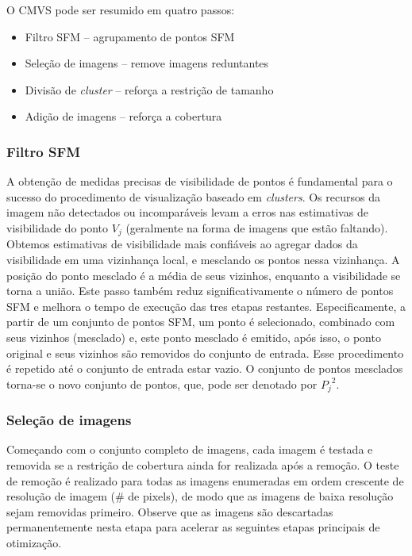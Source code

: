 \begin{itemize}
O CMVS pode ser resumido em quatro passos:

\begin{itemize}
\item Filtro SFM -- agrupamento de pontos SFM
\item Seleção de imagens -- remove imagens reduntantes
\item Divisão de \emph{cluster} -- reforça a restrição de tamanho
\item Adição de imagens -- reforça a cobertura
\end{itemize}

\subsubsection*{Filtro SFM}
A obtenção de medidas precisas de visibilidade de pontos é fundamental para o sucesso do procedimento de visualização baseado em \emph{clusters}. Os recursos da imagem não detectados ou incomparáveis levam a erros nas estimativas de visibilidade do ponto $V_j$ (geralmente na forma de imagens que estão faltando). Obtemos estimativas de visibilidade mais confiáveis ao agregar dados da visibilidade em uma vizinhança local, e mesclando os pontos nessa vizinhança. A posição do ponto mesclado é a média de seus vizinhos, enquanto a visibilidade se torna a união. Este passo também reduz significativamente o número de pontos SFM e melhora o tempo de execução das tres etapas restantes. Especificamente, a partir de um conjunto de pontos SFM, um ponto é selecionado, combinado com seus vizinhos (mesclado) e, este ponto mesclado é emitido, após isso, o ponto original e seus vizinhos são removidos do conjunto de entrada. Esse procedimento é repetido até o conjunto de entrada estar vazio. O conjunto de pontos mesclados torna-se o novo conjunto de pontos, que, pode ser denotado por ${P_j}^2$. %

\subsubsection*{Seleção de imagens}
Começando com o conjunto completo de imagens, cada imagem é testada e removida se a restrição de cobertura ainda for realizada após a remoção. O teste de remoção é realizado para todas as imagens enumeradas em ordem crescente de resolução de imagem (\# de pixels), de modo que as imagens de baixa resolução sejam removidas primeiro. Observe que as imagens são descartadas permanentemente nesta etapa para acelerar as seguintes etapas principais de otimização.


\end{itemize}
